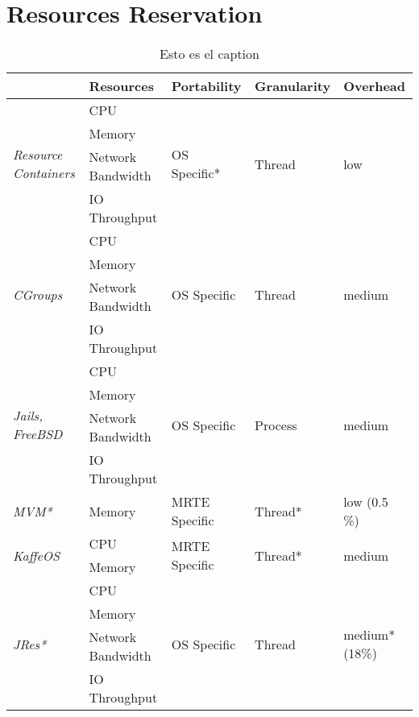 
%

\section{Resources Reservation}



\begin{table}
\caption{Esto es el caption}
\begin{tabular}{|l|l|l|l|l|}
\hline %
 & \textbf{Resources} & \textbf{Portability} & \textbf{Granularity} & \textbf{Overhead} \\ 
\hline %
\multirow{4}{*}{\textit{Resource Containers}} & CPU & \multirow{4}{*}{OS Specific*} & \multirow{4}{*}{Thread} & \multirow{4}{*}{low} \\
& Memory & & & \\
& Network Bandwidth & & & \\
& IO Throughput & & & \\
\hline %
\multirow{4}{*}{\textit{CGroups}} & CPU & \multirow{4}{*}{OS Specific} & \multirow{4}{*}{Thread} & \multirow{4}{*}{medium} \\
& Memory & & & \\
& Network Bandwidth & & & \\
& IO Throughput & & & \\
\hline %
\multirow{4}{*}{\textit{Jails, FreeBSD}} & CPU & \multirow{4}{*}{OS Specific} & \multirow{4}{*}{Process} & \multirow{4}{*}{medium} \\
& Memory & & & \\
& Network Bandwidth & & & \\
& IO Throughput & & & \\
\hline %
\textit{MVM*} & Memory & MRTE Specific & Thread* & low (0.5 \%) \\
\hline %
\multirow{2}{*}{\textit{KaffeOS}} & CPU & \multirow{2}{*}{MRTE Specific} & \multirow{2}{*}{Thread*} & \multirow{2}{*}{medium} \\
& Memory & & & \\
\hline %
\multirow{4}{*}{\textit{JRes*}} & CPU & \multirow{4}{*}{OS Specific} & \multirow{4}{*}{Thread} & \multirow{4}{*}{medium* (18\%)} \\
& Memory & & & \\
& Network Bandwidth & & & \\
& IO Throughput & & & \\

\end{tabular}
\end{table}
